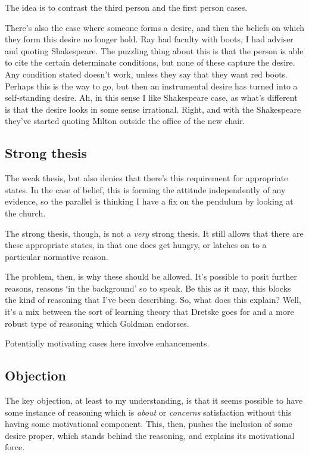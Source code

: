 \documentclass[10pt]{article}
\begin{document}
The idea is to contrast the third person and the first person cases.

There's also the case where someone forms a desire, and then the beliefs on which they form this desire no longer hold.
Ray had faculty with boots, I had adviser and quoting Shakespeare.
The puzzling thing about this is that the person is able to cite the certain determinate conditions, but none of these capture the desire.
Any condition stated doesn't work, unless they say that they want red boots.
Perhaps this is the way to go, but then an instrumental desire has turned into a self-standing desire.
Ah, in this sense I like Shakespeare case, as what's different is that the desire looks in some sense irrational.
Right, and with the Shakespeare they've started quoting Milton outside the office of the new chair.

\subsection{Strong thesis}
\label{sec:strong-thesis}


The weak thesis, but also denies that there's this requirement for appropriate states.
In the case of belief, this is forming the attitude independently of any evidence, so the parallel is thinking I have a fix on the pendulum by looking at the church.

The strong thesis, though, is not a \emph{very} strong thesis.
It still allows that there are these appropriate states, in that one does get hungry, or latches on to a particular normative reason.

The problem, then, is why these should be allowed.
It's possible to posit further reasons, reasons `in the background' so to speak.
Be this as it may, this blocks the kind of reasoning that I've been describing.
So, what does this explain?
Well, it's a mix between the sort of learning theory that Dretske goes for and a more robust type of reasoning which Goldman endorses.

Potentially motivating cases here involve enhancements.


\subsection{Objection}
\label{sec:objection}

The key objection, at least to my understanding, is that it seems possible to have some instance of reasoning which is \emph{about} or \emph{concerns} satisfaction without this having some motivational component.
This, then, pushes the inclusion of some desire proper, which stands behind the reasoning, and explains its motivational force.
\end{document}
